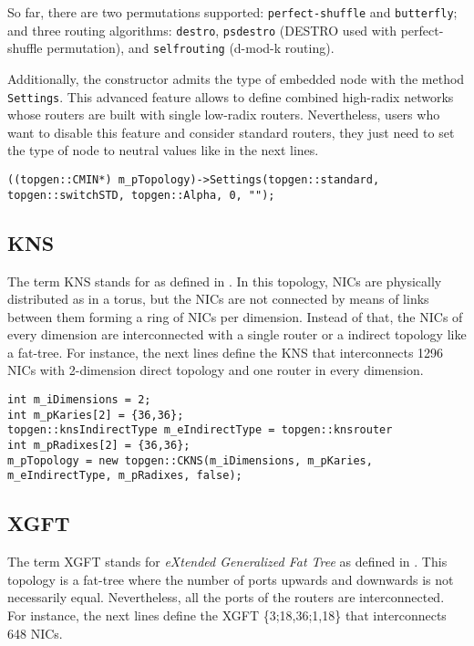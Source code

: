 \documentclass[12pt,onecolumn]{report}
\begin{document}
So far, there are two permutations supported: \verb|perfect-shuffle| and \verb|butterfly|; and three routing algorithms: \verb|destro|, \verb|psdestro| (DESTRO used with perfect-shuffle permutation), and \verb|selfrouting| (d-mod-k routing).

Additionally, the constructor admits the type of embedded node with the method \verb|Settings|. This advanced feature allows to define combined high-radix networks whose routers are built with single low-radix routers. Nevertheless, users who want to disable this feature and consider standard routers, they just need to set the type of node to neutral values like in the next lines.

\begin{lstlisting}
((topgen::CMIN*) m_pTopology)->Settings(topgen::standard, topgen::switchSTD, topgen::Alpha, 0, "");
\end{lstlisting}

\subsection*{KNS}

The term KNS stands for \textit{} as defined in \cite{Penaranda16}. In this topology, NICs are physically distributed as in a torus, but the NICs are not connected by means of links between them forming a ring of NICs per dimension. Instead of that, the NICs of every dimension are interconnected with a single router or a indirect topology like a fat-tree. For instance, the next lines define the KNS that interconnects 1296 NICs with 2-dimension direct topology and one router in every dimension.

\begin{lstlisting}
int m_iDimensions = 2;
int m_pKaries[2] = {36,36};
topgen::knsIndirectType m_eIndirectType = topgen::knsrouter
int m_pRadixes[2] = {36,36};
m_pTopology = new topgen::CKNS(m_iDimensions, m_pKaries, m_eIndirectType, m_pRadixes, false);
\end{lstlisting}

\subsection*{XGFT}

The term XGFT stands for \textit{eXtended Generalized Fat Tree} as defined in \cite{Yuan}. This topology is a fat-tree where the number of ports upwards and downwards is not necessarily equal. Nevertheless, all the ports of the routers are interconnected. For instance, the next lines define the XGFT \{3;18,36;1,18\} that interconnects 648 NICs.
\end{document}
